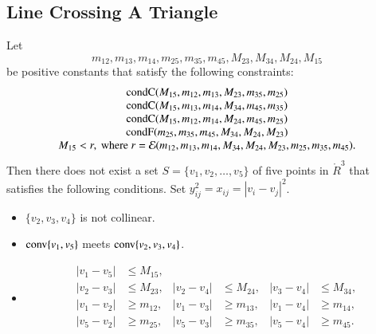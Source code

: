 \begin{tarskidata}
\begin{tarski}
\section{Line Crossing A Triangle}

\begin{lemma}
Let $$m_{12},m_{13},m_{14},m_{25},m_{35},m_{45},M_{23},M_{34},M_{24},M_{15}$$ 
be positive constants that satisfy the following constraints:
	$$
	\begin{array}{clll}
	{\operatorname{condC}}(M_{15},m_{12},m_{13},M_{23},m_{35},m_{25})\\
	{\operatorname{condC}}(M_{15},m_{13},m_{14},M_{34},m_{45},m_{35})\\
	{\operatorname{condC}}(M_{15},m_{12},m_{14},M_{24},m_{45},m_{25})\\
	{\operatorname{condF}}(m_{25},m_{35},m_{45},M_{34},M_{24},M_{23})\\
	M_{15} < r, \text{ where } 
	r = {\mathcal E}(m_{12},m_{13},m_{14},M_{34},M_{24},M_{23},m_{25},m_{35},m_{45}).
	\end{array}
	$$
Then there does not exist a set $S=\{v_1,v_2,\ldots,v_5\}$ of five
points  in $\ring{R}^3$ that satisfies the following conditions.  
Set $y_{ij}^2 = x_{ij} = |v_i-v_j|^2$.
	\begin{itemize}
	\item $\{v_2,v_3,v_4\}$ is not collinear.
	\item ${\operatorname{conv}}\{v_1,v_5\}$ meets ${\operatorname{conv}}\{v_2,v_3,v_4\}$.
	\item 
		$$
		\begin{array}{rlrlrl}
		|v_1-v_5| &\le M_{15},\\
		|v_2-v_3| &\le M_{23}, &|v_2-v_4| &\le M_{24}, & |v_3-v_4|&\le M_{34},\\
		|v_1-v_2| &\ge m_{12},&|v_1-v_3| &\ge m_{13},& |v_1-v_4|&\ge m_{14},\\
		|v_5-v_2| &\ge m_{25},&|v_5-v_3| &\ge m_{35},& |v_5-v_4|&\ge m_{45}.\\
		\end{array}
		$$
	\end{itemize}
\end{lemma}




\end{tarski}
\end{tarskidata}
